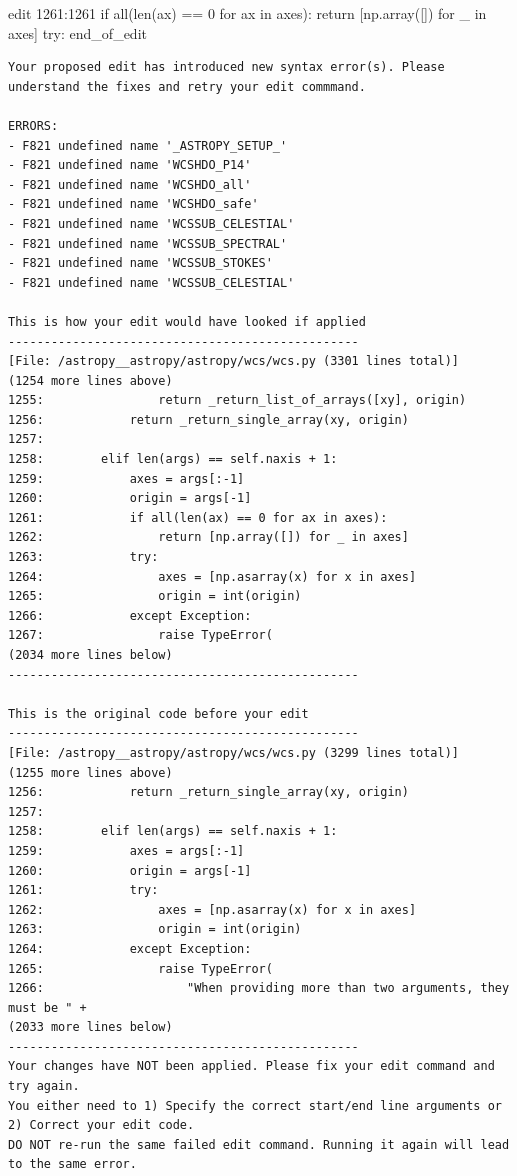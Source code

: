 {\begin{agentbox}
\hrulefill
\begin{CodeVerbatim}[breaklines=true, breakanywhere=true]
edit 1261:1261
            if all(len(ax) == 0 for ax in axes):
                return [np.array([]) for _ in axes]
            try:
end_of_edit
\end{CodeVerbatim}
\end{agentbox}
\begin{observationbox}\begin{Verbatim}[breaklines=true, breakanywhere=true]
Your proposed edit has introduced new syntax error(s). Please understand the fixes and retry your edit commmand.

ERRORS:
- F821 undefined name '_ASTROPY_SETUP_'
- F821 undefined name 'WCSHDO_P14'
- F821 undefined name 'WCSHDO_all'
- F821 undefined name 'WCSHDO_safe'
- F821 undefined name 'WCSSUB_CELESTIAL'
- F821 undefined name 'WCSSUB_SPECTRAL'
- F821 undefined name 'WCSSUB_STOKES'
- F821 undefined name 'WCSSUB_CELESTIAL'

This is how your edit would have looked if applied
-------------------------------------------------
[File: /astropy__astropy/astropy/wcs/wcs.py (3301 lines total)]
(1254 more lines above)
1255:                return _return_list_of_arrays([xy], origin)
1256:            return _return_single_array(xy, origin)
1257:
1258:        elif len(args) == self.naxis + 1:
1259:            axes = args[:-1]
1260:            origin = args[-1]
1261:            if all(len(ax) == 0 for ax in axes):
1262:                return [np.array([]) for _ in axes]
1263:            try:
1264:                axes = [np.asarray(x) for x in axes]
1265:                origin = int(origin)
1266:            except Exception:
1267:                raise TypeError(
(2034 more lines below)
-------------------------------------------------

This is the original code before your edit
-------------------------------------------------
[File: /astropy__astropy/astropy/wcs/wcs.py (3299 lines total)]
(1255 more lines above)
1256:            return _return_single_array(xy, origin)
1257:
1258:        elif len(args) == self.naxis + 1:
1259:            axes = args[:-1]
1260:            origin = args[-1]
1261:            try:
1262:                axes = [np.asarray(x) for x in axes]
1263:                origin = int(origin)
1264:            except Exception:
1265:                raise TypeError(
1266:                    "When providing more than two arguments, they must be " +
(2033 more lines below)
-------------------------------------------------
Your changes have NOT been applied. Please fix your edit command and try again.
You either need to 1) Specify the correct start/end line arguments or 2) Correct your edit code.
DO NOT re-run the same failed edit command. Running it again will lead to the same error.


\end{Verbatim}
\end{observationbox}}

